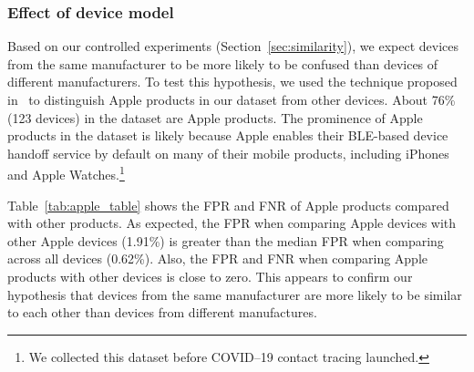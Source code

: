 \subsubsection{Effect of device model}

Based on our controlled experiments (Section~\ref{sec:similarity}), we expect devices from the same manufacturer to be more
likely to be confused than devices of different manufacturers. To test this hypothesis, we used the technique
proposed in~\cite{celosia2020close} to distinguish Apple products in our dataset
from other devices. About 76\% (123 devices) in the dataset are Apple
products. The prominence of Apple products in the dataset is likely
because Apple enables their BLE-based device handoff service by default on many of their mobile products, including iPhones and Apple Watches.\footnote{We collected this dataset before COVID--19 contact tracing launched.}

Table~\ref{tab:apple_table} shows the FPR and FNR of Apple products compared
with other products. As expected, the FPR when comparing Apple devices with other Apple devices (1.91\%) is greater than
the median FPR when comparing across all devices (0.62\%). Also, the FPR and FNR when comparing Apple products with 
other devices is close to zero.
This appears to confirm our hypothesis that devices from the same manufacturer are more likely to be similar to each other than devices from different manufactures.







